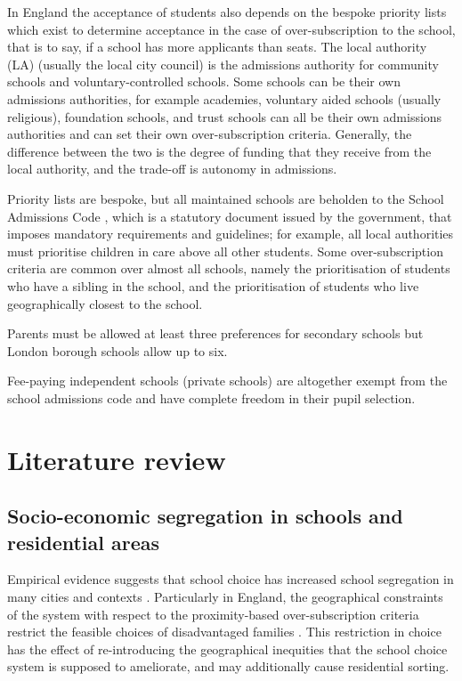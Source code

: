 \documentclass{article}
\begin{document}
\begin{multicols}{2}
In England the acceptance of students also depends on the bespoke priority lists which exist to determine acceptance in the case of over-subscription to the school, that is to say, if a school has more applicants than seats. The local authority (LA) (usually the local city council) is the admissions authority for community schools and voluntary-controlled schools. Some schools can be their own admissions authorities, for example academies, voluntary aided schools (usually religious), foundation schools, and trust schools can all be their own admissions authorities and can set their own over-subscription criteria. Generally, the difference between the two is the degree of funding that they receive from the local authority, and the trade-off is autonomy in admissions.

Priority lists are bespoke, but all maintained schools are beholden to the School Admissions Code \cite{SchoolAdmissionsCode}, which is a statutory document issued by the government, that imposes mandatory requirements and guidelines; for example, all local authorities must prioritise children in care above all other students. Some over-subscription criteria are common over almost all schools, namely the prioritisation of students who have a sibling in the school, and the prioritisation of students who live geographically closest to the school.

Parents must be allowed at least three preferences for secondary schools but London borough schools allow up to six. 

Fee-paying independent schools (private schools) are altogether exempt from the school admissions code and have complete freedom in their pupil selection.

\section{Literature review}
\subsection{Socio-economic segregation in schools and residential areas}
Empirical evidence suggests that school choice has increased school segregation in many cities and contexts \cite{wilsonSchoolChoiceCity2019}. Particularly in England, the geographical constraints of the system with respect to the proximity-based over-subscription criteria restrict the feasible choices of disadvantaged families \cite{burgessParentalChoicePrimary2011a,burgessSchoolChoiceEngland2019}. This restriction in choice has the effect of re-introducing the geographical inequities that the school choice system is supposed to ameliorate, and may additionally cause residential sorting. 


\end{multicols}
\end{document}
